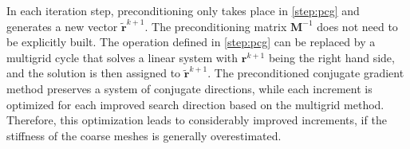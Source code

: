 In each iteration step, preconditioning only takes place in \autoref{step:pcg} and generates a new vector $\tilde{\boldsymbol{r}}^{k+1}$. The preconditioning matrix $\boldsymbol{M}^{-1}$ does not need to be explicitly built. The operation defined in \autoref{step:pcg} can be replaced by a multigrid cycle that solves a linear system with $\boldsymbol{r}^{k+1}$ being the right hand side, and the solution is then assigned to $\tilde{\boldsymbol{r}}^{k+1}$. The preconditioned conjugate gradient method preserves a system of conjugate directions, while each increment is optimized for each improved search direction based on the multigrid method. Therefore, this optimization leads to considerably improved increments, if the stiffness of the coarse meshes is generally overestimated.
